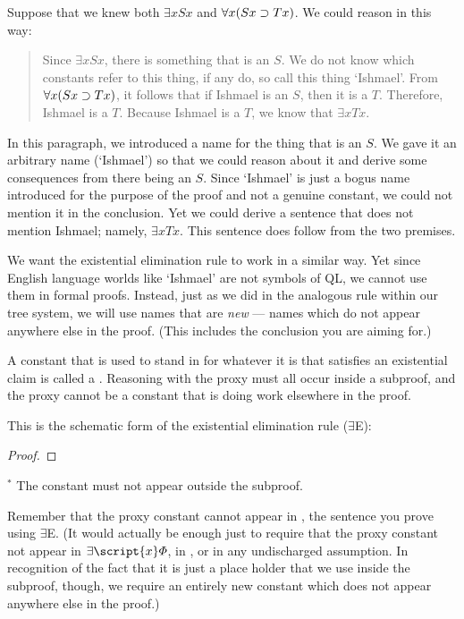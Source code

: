 Suppose that we knew both $\exists x Sx$ and $\forall x(Sx \supset Tx)$. We could reason in this way:
\begin{quote}
Since $\exists x Sx$, there is something that is an $S$. We do not know which constants refer to this thing, if any do, so call this thing `Ishmael'. From $\forall x(Sx \supset Tx)$, it follows that if Ishmael is an $S$, then it is a $T$. Therefore, Ishmael is a $T$.  Because Ishmael is a $T$, we know that $\exists x Tx$.
\end{quote}
In this paragraph, we introduced a name for the thing that is an $S$. We gave it an arbitrary name (`Ishmael') so that we could reason about it and derive some consequences from there being an $S$. Since `Ishmael' is just a bogus name introduced for the purpose of the proof and not a genuine constant, we could not mention it in the conclusion. Yet we could derive a sentence that does not mention Ishmael; namely, $\exists x Tx$. This sentence does follow from the two premises.

We want the existential elimination rule to work in a similar way. Yet since English language worlds like `Ishmael' are not symbols of QL, we cannot use them in formal proofs. Instead, just as we did in the analogous rule within our tree system, we will use names that are \emph{new} --- names which do not appear anywhere else in the proof. (This includes the conclusion you are aiming for.)

A constant that is used to stand in for whatever it is that satisfies an existential claim is called a . Reasoning with the proxy must all occur inside a subproof, and the proxy cannot be a constant that is doing work elsewhere in the proof.

This is the schematic form of the existential elimination rule ($\exists$E): 

\begin{proof}
	\open	
		 
	\close
	 
\end{proof}
$^\ast$ The constant  must not appear outside the subproof.

Remember that the proxy constant cannot appear in \metaB{}, the sentence you prove using $\exists$E. (It would actually be enough just to require that the proxy constant not appear in $\exists\script{x}\metaA{}$, in \metaB{}, or in any undischarged assumption. In recognition of the fact that it is just a place holder that we use inside the subproof, though, we require an entirely new constant which does not appear anywhere else in the proof.)

